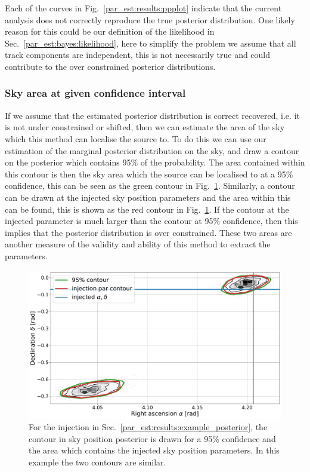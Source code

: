 Each of the curves in Fig.~\ref{par_est:results:ppplot} indicate that the current analysis does not correctly reproduce the true posterior distribution. 
One likely reason for this could be our definition of the likelihood in Sec.~\ref{par_est:bayes:likelihood}, here to simplify the problem we assume that all track components are independent, this is not necessarily true and could contribute to the over constrained posterior distributions. 

%
%
\subsubsection{\label{par_est:results:simulations:skyarea}Sky area at given confidence interval}
%
%

If we assume that the estimated posterior distribution is correct recovered, i.e. it is not under constrained or shifted, then we can estimate the area of the sky which this method can localise the source to. 
To do this we can use our estimation of the marginal posterior distribution on the sky, and draw a contour on the posterior which contains 95\% of the probability.
The area contained within this contour is then the sky area which the source can be localised to at a 95\% confidence, this can be seen as the green contour in Fig.~\ref{par_est:results:sky_area_example}.
Similarly, a contour can be drawn at the injected sky position parameters and the area within this can be found, this is shown as the red contour in Fig.~\ref{par_est:results:sky_area_example}.
If the contour at the injected parameter is much larger than the contour at 95\% confidence, then this implies that the posterior distribution is over constrained.
These two areas are another measure of the validity and ability of this method to extract the parameters. 
%
\begin{figure}[ht]
    \centering
    \includegraphics[width=\linewidth]{C5_parameter/skyarea_example.pdf}
    \caption[Area of sky at 95\% confidence]{For the injection in Sec.~\ref{par_est:results:example_posterior}, the contour in sky position posterior is drawn for a 95\% confidence and the area which contains the injected sky position parameters. In this example the two contours are similar.}
    \label{par_est:results:sky_area_example}
\end{figure}


